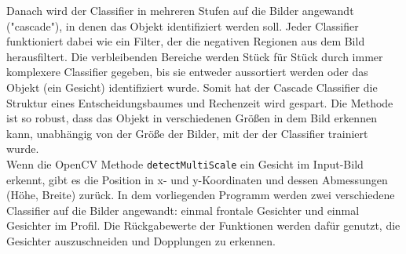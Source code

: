 Danach wird der Classifier in mehreren Stufen auf die Bilder angewandt ("cascade"), in denen das Objekt identifiziert werden soll. Jeder Classifier funktioniert dabei wie ein Filter, der die negativen Regionen aus dem Bild herausfiltert. Die verbleibenden Bereiche werden Stück für Stück durch immer komplexere Classifier gegeben, bis sie entweder aussortiert werden oder das Objekt (ein Gesicht) identifiziert wurde. Somit hat der Cascade Classifier die Struktur eines Entscheidungsbaumes und Rechenzeit wird gespart. Die Methode ist so robust, dass das Objekt in verschiedenen Größen in dem Bild erkennen kann, unabhängig von der Größe der Bilder, mit der der Classifier trainiert wurde.\\
Wenn die OpenCV Methode \texttt{detectMultiScale} ein Gesicht im Input-Bild erkennt, gibt es die Position in x- und y-Koordinaten und dessen Abmessungen (Höhe, Breite) zurück. In dem vorliegenden Programm werden zwei verschiedene Classifier auf die Bilder angewandt: einmal frontale Gesichter und einmal Gesichter im Profil. Die Rückgabewerte der Funktionen werden dafür genutzt, die Gesichter auszuschneiden und Dopplungen zu erkennen.
